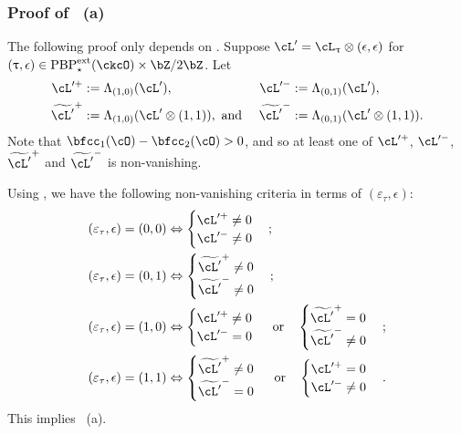 \documentclass[12pt,a4paper]{amsart}
\numberwithin{equation}{section}
\theoremstyle{remark}
\def\PBPes{\mathrm{PBP}^{\mathrm{ext}}_{\star}}
\begin{document}
\subsubsection*{ Proof of ~(a) }
\def\opac{\cL'^+}
\def\onac{\cL'^-}
\def\tpac{\widetilde{\cL'}^+}
\def\tnac{\widetilde{\cL'}^-}
The following proof only depends on .
Suppose $\cL' = \ac_{\uptau}\lotimes (\epsilon,\epsilon)$ for $(\uptau,\epsilon)\in \PBPes(\ckcO)\times \bZ/2\bZ$.
Let
  \begin{align*}
    \opac &:= \Lambda_{(1,0)}(\cL'), &
    \onac &:= \Lambda_{(0,1)}(\cL'), \\
    \tpac &:= \Lambda_{(1,0)}(\cL'\lotimes (1,1)),\text{ and } &
    \tnac &:= \Lambda_{(0,1)}(\cL'\lotimes (1,1)).
  \end{align*}
Note that $\bfcc_{1}(\cO)-\bfcc_{2}(\cO)>0$, and so at least one of $\opac$,
$\onac$, $\tpac$ and $\tnac$ is non-vanishing.

Using , we
have the following non-vanishing criteria in terms of $(\varepsilon_{\tau},\epsilon)$:
\[
\begin{split}
  (\varepsilon_{\tau},\epsilon) = (0,0) & \Leftrightarrow
  \begin{cases} \opac \neq 0\\ \onac \neq 0 \end{cases};\\
  (\varepsilon_{\tau},\epsilon) = (0,1) & \Leftrightarrow
  \begin{cases} \tpac \neq 0\\ \tnac \neq 0 \end{cases};\\
  (\varepsilon_{\tau},\epsilon) = (1,0) & \Leftrightarrow
  \begin{cases} \opac \neq 0 \\ \onac  = 0 \end{cases} \text{ or} \quad
  \begin{cases} \tpac = 0 \\ \tnac  \neq 0 \end{cases}; \\
  (\varepsilon_{\tau},\epsilon) = (1,1) & \Leftrightarrow
  \begin{cases} \tpac \neq 0 \\ \tnac  = 0 \end{cases} \text{ or} \quad
  \begin{cases} \opac = 0 \\ \onac  \neq 0 \end{cases}.
\end{split}
\]
This implies ~(a).
\end{document}
